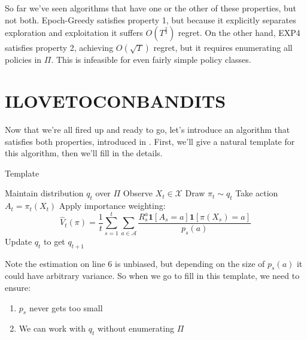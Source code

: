 \documentclass[11pt]{article}
\begin{document}
So far we've seen algorithms that have one or the other of these properties, but not both. Epoch-Greedy satisfies property 1, but because it explicitly separates exploration and exploitation it suffers $O(T^{\frac{2}{3}})$ regret. On the other hand, EXP4 satisfies property 2, achieving $O(\sqrt{T})$ regret, but it requires enumerating all policies in $\Pi$. This is infeasible for even fairly simple policy classes.

\section{ILOVETOCONBANDITS}
Now that we're all fired up and ready to go, let's introduce an algorithm that satisfies both properties, introduced in \cite{agarwal2014taming}. First, we'll give a natural template for this algorithm, then we'll fill in the details.

\begin{algorithm}
	\caption{Template}
	\begin{algorithmic}[1]
		\STATE Maintain distribution $q_t$ over $\Pi$ 
		\STATE Observe $X_t \in \mathcal{X}$
		\STATE Draw $\pi_t \sim q_t$
		\STATE Take action $A_t = \pi_t(X_t)$ 
		\STATE Apply importance weighting:
		$$\hat{V}_t(\pi) = \frac{1}{t} \sum_{s=1}^t \sum_{a \in \mathcal{A}} \frac{R_s^a \mathbf{1}[A_s = a] \mathbf{1}[\pi(X_s) = a]}{p_s(a)}$$
		\STATE Update $q_t$ to get $q_{t+1}$
		\ENDFOR
	\end{algorithmic}
\end{algorithm}

Note the estimation on line 6 is unbiased, but depending on the size of $p_s(a)$ it could have arbitrary variance. So when we go to fill in this template, we need to ensure:
\begin{enumerate}
	\item $p_s$ never gets too small
	\item We can work with $q_t$ without enumerating $\Pi$
\end{enumerate}
\end{document}
